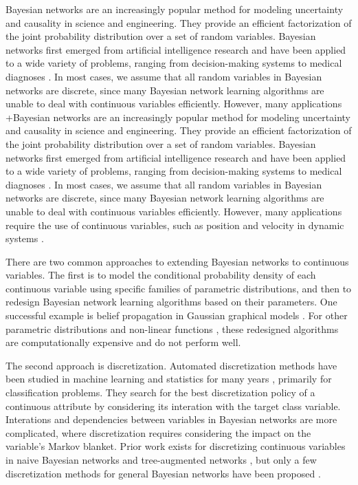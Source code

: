 Bayesian networks \citep{Pearl_1988, PGM_2009} are an increasingly popular method for modeling uncertainty and causality in science and engineering.
They provide an efficient factorization of the joint probability distribution over a set of random variables.
Bayesian networks first emerged from artificial intelligence research and have been applied to a wide variety of problems, ranging from decision-making systems \citep{DMU_2015}  to medical diagnoses \citep{Lustgarten_2011}.
In most cases, we assume that all random variables in Bayesian networks are discrete, since many Bayesian network learning algorithms are unable to deal with continuous variables efficiently.
However, many applications   +Bayesian networks \citep{Pearl_1988, PGM_2009} are an increasingly popular method for modeling uncertainty and causality in science and engineering.
They provide an efficient factorization of the joint probability distribution over a set of random variables.
Bayesian networks first emerged from artificial intelligence research and have been applied to a wide variety of problems, ranging from decision-making systems \citep{DMU_2015} to medical diagnoses \citep{Lustgarten_2011}.
In most cases, we assume that all random variables in Bayesian networks are discrete, since many Bayesian network learning algorithms are unable to deal with continuous variables efficiently.
However, many applications require the use of continuous variables, such as position and velocity in dynamic systems \citep{kochenderfer2010airspace}.

There are two common approaches to extending Bayesian networks to continuous variables.
The first is to model the conditional probability density of each continuous variable using specific families of parametric distributions, and then to redesign Bayesian network learning algorithms based on their parameters.
One successful example is belief propagation in Gaussian graphical models \citep{Weiss_2011}.
For other parametric distributions and non-linear functions \citep{Ihler_2009}, these redesigned algorithms are computationally expensive and do not perform well.

The second approach is discretization.
Automated discretization methods have been studied in machine learning and statistics for many years \citep{Dougherty_1995, Kerber_1992, Holte_1993, Fayyad_1993}, primarily for classification problems.
They search for the best discretization policy of a continuous attribute by considering its interation with the target class variable.
Interations and dependencies between variables in Bayesian networks are more complicated, where discretization requires considering the impact on the variable's Markov blanket.
Prior work exists for discretizing continuous variables in naive Bayesian networks and tree-augmented networks \citep{Fried_naive}, but only a few discretization methods for general Bayesian networks have been proposed \citep{Friedman_1996, Kozlov_1997, Monti_1998, Steck_2007}.

